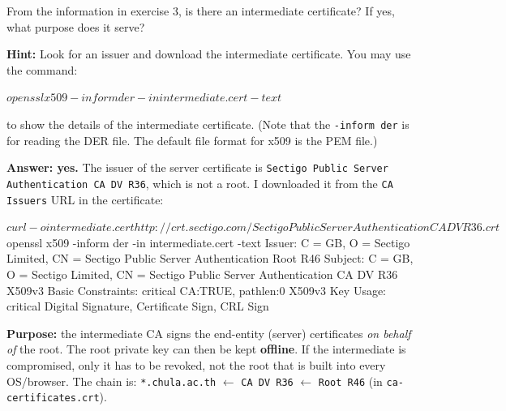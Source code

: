 \documentclass[a4paper, 10pt]{article}
\begin{document}
\begin{problem}
	From the information in exercise 3, is there an intermediate certificate?
	If yes, what purpose does it serve?

	\noindent \textbf{Hint:} Look for an issuer and download the intermediate certificate.
	You may use the command:
	\begin{codingbox}[language=bash]
$ openssl x509 -inform der -in intermediate.cert -text
$
\end{codingbox}
	\noindent to show the details of the intermediate certificate.
	(Note that the \texttt{-inform der} is for reading the DER file. The default file format for x509 is the PEM file.)
\end{problem}

\begin{solution}
	\noindent \textbf{Answer: yes.} The issuer of the server certificate is \texttt{Sectigo Public Server Authentication CA DV R36}, which is not a root.
	I downloaded it from the \texttt{CA Issuers} URL in the certificate:
\begin{codingbox*}[numbers=none, xleftmargin=0pt, belowskip=6pt, basicstyle=\ttfamily\footnotesize\color{editortext}]
$ curl -o intermediate.cert http://crt.sectigo.com/SectigoPublicServerAuthenticationCADVR36.crt
$ openssl x509 -inform der -in intermediate.cert -text
  Issuer:  C = GB, O = Sectigo Limited, CN = Sectigo Public Server Authentication Root R46
  Subject: C = GB, O = Sectigo Limited, CN = Sectigo Public Server Authentication CA DV R36
  X509v3 Basic Constraints: critical
      CA:TRUE, pathlen:0
  X509v3 Key Usage: critical
      Digital Signature, Certificate Sign, CRL Sign
\end{codingbox*}

	\myspace

	\noindent \textbf{Purpose:} the intermediate CA signs the end-entity (server) certificates \emph{on behalf of} the root.
	The root private key can then be kept \textbf{offline}.
	If the intermediate is compromised, only it has to be revoked, not the root that is built into every OS/browser.
	The chain is: \texttt{*.chula.ac.th} $\leftarrow$ \texttt{CA DV R36} $\leftarrow$ \texttt{Root R46} (in \texttt{ca-certificates.crt}).
\end{solution}
\end{document}
